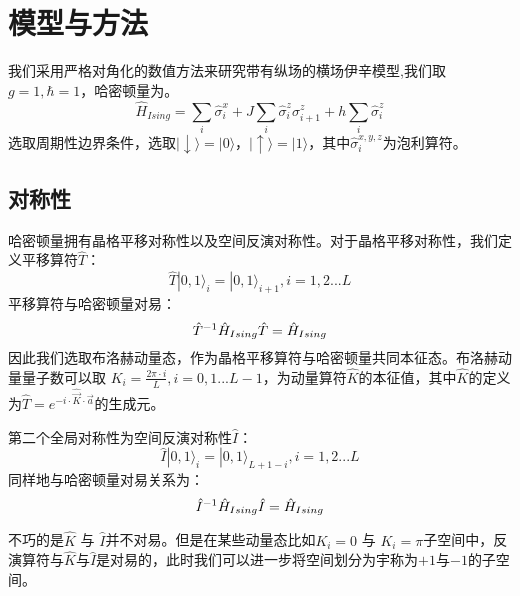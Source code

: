 \section{模型与方法}\label{4sec:method}
我们采用严格对角化的数值方法来研究带有纵场的横场伊辛模型,我们取$g=1,\hbar=1$，哈密顿量为。
\begin{equation}
\hat{H}_{Ising} = \sum_i\hat{\sigma}^x_i + J\sum_{i}\hat{\sigma}^z_i\sigma^z_{i+1} + h\sum_{i}\hat{\sigma}^z_i 
\label{Ising}
\end{equation}
选取周期性边界条件，选取$|\downarrow\rangle=|0\rangle$，$|\uparrow\rangle=|1\rangle$，其中$\hat{\sigma}_i^{x,y,z}$为泡利算符。

\subsection{对称性}
哈密顿量拥有晶格平移对称性以及空间反演对称性。对于晶格平移对称性，我们定义平移算符$\hat{T}$：
\begin{equation}
	\hat{T} |0,1 \rangle_{i} =  |0,1 \rangle_{i+1}, i=1,2...L
\end{equation}
平移算符与哈密顿量对易：
\begin{equation}
	\hat{T}^{-1}\hat{H}_{Ising}\hat{T} = \hat{H}_{Ising}\\
\end{equation}
因此我们选取布洛赫动量态，作为晶格平移算符与哈密顿量共同本征态。布洛赫动量量子数可以取 $K_i=\frac{2\pi\cdot i}{L},i=0,1...L-1$，为动量算符$\hat{K}$的本征值，其中$\hat{K}$的定义为$\hat{T} = e^{-i\cdot\hat{\vec{K} }\cdot \vec{a}}$的生成元。

第二个全局对称性为空间反演对称性$\hat{I}$：
\begin{equation}
	\hat{I} |0,1 \rangle_{i} =  |0,1 \rangle_{L+1-i}, i=1,2...L
\end{equation}
同样地与哈密顿量对易关系为：
\begin{equation}
	\hat{I}^{-1}\hat{H}_{Ising}\hat{I} = \hat{H}_{Ising}\\
\end{equation}

不巧的是$\hat{K}$ 与 $\hat{I}$并不对易。但是在某些动量态比如$K_i=0$ 与 $K_i=\pi$子空间中，反演算符与$\hat{K}$与$\hat{I}$是对易的，此时我们可以进一步将空间划分为宇称为$+1$与$-1$的子空间。
\begin{comment}
在做了如上所述的块对角化之后，我们将要严格对角化的矩阵维度最大为动量宇称$KP=0+$
子空间的维度$L=18,KP=0+$，此时$D=7685$。
\end{comment}

